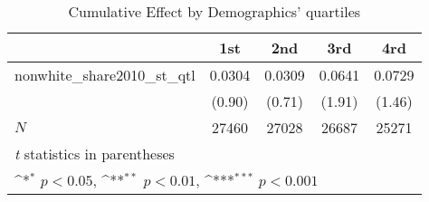 \begin{table}[htbp]\centering
\def\sym#1{\ifmmode^{#1}\else\(^{#1}\)\fi}
\caption{Cumulative Effect by Demographics' quartiles}
\begin{tabular}{l*{4}{c}}
\hline\hline
            &\multicolumn{1}{c}{1st}&\multicolumn{1}{c}{2nd}&\multicolumn{1}{c}{3rd}&\multicolumn{1}{c}{4rd}\\
\hline
nonwhite\_share2010\_st\_qtl&      0.0304         &      0.0309         &      0.0641         &      0.0729         \\
            &      (0.90)         &      (0.71)         &      (1.91)         &      (1.46)         \\
\hline
\(N\)       &       27460         &       27028         &       26687         &       25271         \\
\hline\hline
\multicolumn{5}{l}{\footnotesize \textit{t} statistics in parentheses}\\
\multicolumn{5}{l}{\footnotesize \sym{*} \(p<0.05\), \sym{**} \(p<0.01\), \sym{***} \(p<0.001\)}\\
\end{tabular}
\end{table}
